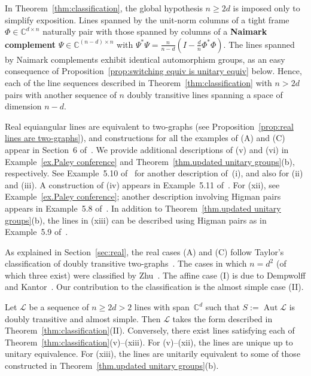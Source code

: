 In Theorem~\ref{thm:classification}, the global hypothesis $n\geq 2d$ is imposed only to simplify exposition.
Lines spanned by the unit-norm columns of a tight frame $\Phi \in \mathbb{C}^{d \times n}$ naturally pair with those spanned by columns of a \textbf{Naimark complement} $\Psi \in \mathbb{C}^{(n-d) \times n}$ with 
$\Psi^* \Psi = \frac{n}{n-d}(I - \frac{d}{n} \Phi^* \Phi)$.
The lines spanned by Naimark complements exhibit identical automorphism groups, as an easy consequence of Proposition~\ref{prop:switching equiv is unitary equiv} below.
Hence, each of the line sequences described in Theorem~\ref{thm:classification} with $n>2d$ pairs with another sequence of $n$ doubly transitive lines spanning a space of dimension $n-d$.

Real equiangular lines are equivalent to two-graphs (see Proposition~\ref{prop:real lines are two-graphs}), and constructions for all the examples of (A) and (C) appear in Section~6 of~\cite{Taylor:77}.
We provide additional descriptions of (v) and (vi) in Example~\ref{ex.Paley conference} and Theorem~\ref{thm.updated unitary groups}(b), respectively.
See Example~5.10 of~\cite{IversonM:18} for another description of~(i), and also for (ii) and (iii).
A construction of (iv) appears in Example~5.11 of~\cite{IversonM:18}.
For (xii), see Example~\ref{ex.Paley conference}; another description involving Higman pairs appears in Example~5.8 of~\cite{IversonM:18}.
In addition to Theorem~\ref{thm.updated unitary groups}(b), the lines in (xiii) can be described using Higman pairs as in Example~5.9 of~\cite{IversonM:18}.


As explained in Section~\ref{sec:real}, the real cases (A) and (C) follow Taylor's classification of doubly transitive two-graphs~\cite{Taylor:92}.
The cases in which $n=d^2$ (of which three exist) were classified by Zhu~\cite{Zhu:15}.
The affine case (I) is due to Dempwolff and Kantor~\cite{DempwolffK:23}.
Our contribution to the classification is the almost simple case (II).

\begin{theorem}
\label{thm:main result}
Let $\mathscr{L}$ be a sequence of $n\geq 2d > 2$ lines with span~$\mathbb{C}^d$ such that $S := \operatorname{Aut} \mathscr{L}$ is doubly transitive and almost simple.
Then $\mathscr{L}$ takes the form described in Theorem~\ref{thm:classification}(II).
Conversely, there exist lines satisfying each of Theorem~\ref{thm:classification}(v)--(xiii). 
For (v)--(xii), the lines are unique up to unitary equivalence.
For (xiii), the lines are unitarily equivalent to some of those constructed in Theorem~\ref{thm.updated unitary groups}(b).
\end{theorem}



